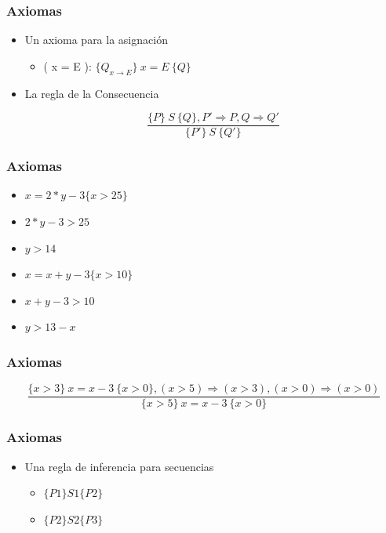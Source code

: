 \documentclass[11pt]{article}
\begin{document}
\subsubsection*{Axiomas}
\label{sec:org54048c9}
\begin{itemize}
\item Un axioma para la asignación
\begin{itemize}
\item ( x = E ): \(\{Q_{x \to E}\} \ x = E \ \{Q\}\)
\end{itemize}
\item La regla de la Consecuencia

\[ \frac{ \{P\} \ S \ \{Q\}, P' \Rightarrow P, Q \Rightarrow
  Q'}{\{P'\} \ S \ \{Q'\}} \]
\end{itemize}

\subsubsection*{Axiomas}
\label{sec:org47926a1}
\begin{itemize}
\item \(x = 2 * y - 3 \{x > 25 \}\)
\item \(2 * y - 3 > 25\)
\item \(y > 14\)
\item \(x = x + y - 3 \{x > 10 \}\)
\item \(x + y - 3 > 10\)
\item \(y > 13 - x\)
\end{itemize}

\subsubsection*{Axiomas}
\label{sec:org6e5345f}
\[ \frac{ \{x > 3\} \ x = x - 3 \ \{x > 0\}, (x > 5) \Rightarrow (x >
  3), (x > 0) \Rightarrow (x > 0)}{\{x > 5\} \ x = x - 3 \ \{x > 0\}} \]

\subsubsection*{Axiomas}
\label{sec:org4527a15}
\begin{itemize}
\item Una regla de inferencia para secuencias
\begin{itemize}
\item \(\{P1\} S1 \{P2\}\)
\item \(\{P2\} S2 \{P3\}\)
\end{itemize}
\end{itemize}
\end{document}

